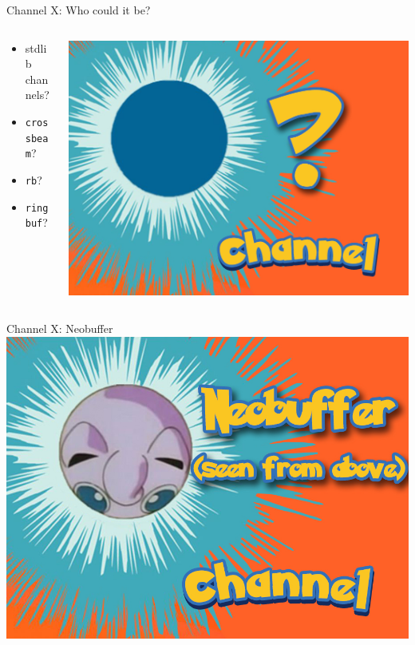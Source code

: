 \documentclass[aspectratio=43]{beamer}
\begin{document}
\begin{frame}{Channel X: Who could it be?}
    \begin{columns}[T]
        \begin{column}{.5\textwidth}
            \begin{itemize}
                \item<1-> stdlib channels?
                \item<2-> \texttt{crossbeam}?
                \item<3-> \texttt{rb}?
                \item<4-> \texttt{ringbuf}?
            \end{itemize}
        \end{column}
        \begin{column}{.5\textwidth}
            \includegraphics[width=\textwidth]{./imgs/who-is-channel.jpg}
        \end{column}
    \end{columns}
\end{frame}

\begin{frame}{Channel X: Neobuffer}
    \centering
    \includegraphics[width=\textwidth]{./imgs/neobuffer.jpg}
\end{frame}
\end{document}
